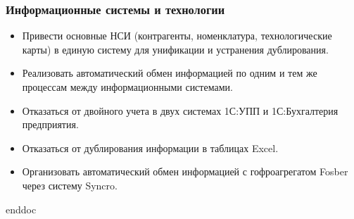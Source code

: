 \subsubsection{Информационные системы и технологии}

\begin{itemize}
\item Привести основные НСИ (контрагенты, номенклатура, технологические карты) в единую систему для унификации и устранения дублирования.
\item Реализовать автоматический обмен информацией по одним и тем же процессам между информационными системами.
\item Отказаться от двойного учета в двух системах 1С:УПП и 1С:Бухгалтерия предприятия.
\item Отказаться от  дублирования информации в таблицах Excel.

\item Организовать автоматический обмен информацией с гофроагрегатом Fosber через систему Syncro.
\end{itemize}




 {enddoc}

